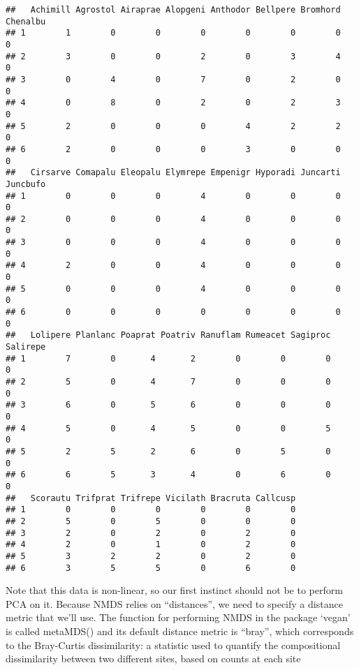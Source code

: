\documentclass[
]{book}
\begin{document}
\begin{verbatim}
##   Achimill Agrostol Airaprae Alopgeni Anthodor Bellpere Bromhord Chenalbu
## 1        1        0        0        0        0        0        0        0
## 2        3        0        0        2        0        3        4        0
## 3        0        4        0        7        0        2        0        0
## 4        0        8        0        2        0        2        3        0
## 5        2        0        0        0        4        2        2        0
## 6        2        0        0        0        3        0        0        0
##   Cirsarve Comapalu Eleopalu Elymrepe Empenigr Hyporadi Juncarti Juncbufo
## 1        0        0        0        4        0        0        0        0
## 2        0        0        0        4        0        0        0        0
## 3        0        0        0        4        0        0        0        0
## 4        2        0        0        4        0        0        0        0
## 5        0        0        0        4        0        0        0        0
## 6        0        0        0        0        0        0        0        0
##   Lolipere Planlanc Poaprat Poatriv Ranuflam Rumeacet Sagiproc Salirepe
## 1        7        0       4       2        0        0        0        0
## 2        5        0       4       7        0        0        0        0
## 3        6        0       5       6        0        0        0        0
## 4        5        0       4       5        0        0        5        0
## 5        2        5       2       6        0        5        0        0
## 6        6        5       3       4        0        6        0        0
##   Scorautu Trifprat Trifrepe Vicilath Bracruta Callcusp
## 1        0        0        0        0        0        0
## 2        5        0        5        0        0        0
## 3        2        0        2        0        2        0
## 4        2        0        1        0        2        0
## 5        3        2        2        0        2        0
## 6        3        5        5        0        6        0
\end{verbatim}

Note that this data is non-linear, so our first instinct should not be to perform PCA on it. Because NMDS relies on ``distances'', we need to specify a distance metric that we'll use. The function for performing NMDS in the package `vegan' is called metaMDS() and its default distance metric is ``bray'', which corresponds to the Bray-Curtis dissimilarity: a statistic used to quantify the compositional dissimilarity between two different sites, based on counts at each site
\end{document}
